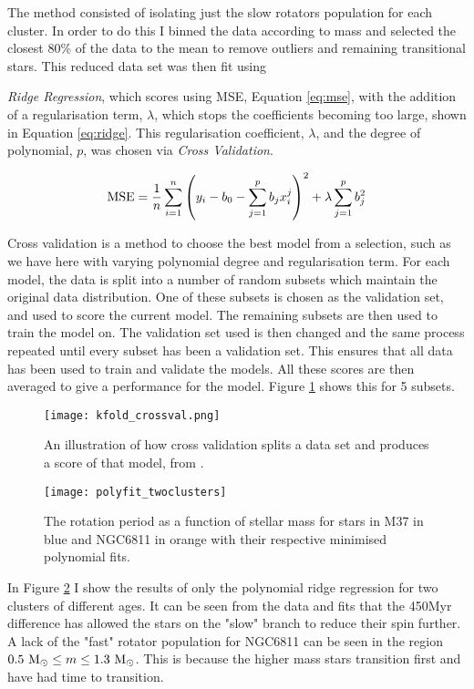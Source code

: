 \documentclass[fleqn,usenatbib]{mnras}
\begin{document}
The method consisted of isolating just the slow rotators population for each cluster.
In order to do this I binned the data according to mass and selected the closest 80\% of the data to the mean to remove outliers and remaining transitional stars.
This reduced data set was then fit using {\textit{Ridge Regression}, which scores using MSE, Equation \ref{eq:mse}, with the addition of a regularisation term, $\lambda$, which stops the coefficients becoming too large, shown in Equation \ref{eq:ridge}.
This regularisation coefficient, $\lambda$, and the degree of polynomial, $p$, was chosen via \textit{Cross Validation}.

\begin{equation}
	\label{eq:ridge}
	\textup{MSE} = \frac{1}{n}\sum_{i = 1}^n \left(y_i - b_0 - \sum_{j = 1}^p b_jx_i^j \right)^2 + \lambda \sum_{j = 1}^p b^2_j
\end{equation}

Cross validation is a method to choose the best model from a selection, such as we have here with varying polynomial degree and regularisation term.
For each model, the data is split into a number of random subsets which maintain the original data distribution.
One of these subsets is chosen as the validation set, and used to score the current model.
The remaining subsets are then used to train the model on.
The validation set used is then changed and the same process repeated until every subset has been a validation set.
This ensures that all data has been used to train and validate the models.
All these scores are then averaged to give a performance for the model.
Figure \ref{fig:cross_validation} shows this for 5 subsets.

\begin{figure}
	\texttt{[image: kfold\_crossval.png]}
	\caption{An illustration of how cross validation splits a data set and produces a score of that model, from \protect\cite{CrossVal}.}
	\label{fig:cross_validation}
\end{figure}



\begin{figure}
	\texttt{[image: polyfit\_twoclusters]}
	\caption{The rotation period as a function of stellar mass for stars in  M37 in blue and NGC6811 in orange with their respective minimised polynomial fits.}
	\label{fig:polyfit_twoclusters}
\end{figure}

In Figure \ref{fig:polyfit_twoclusters} I show the results of only the polynomial ridge regression for two clusters of different ages.
It can be seen from the data and fits that the 450Myr difference has allowed the stars on the "slow" branch to reduce their spin further.
A lack of the "fast" rotator population for NGC6811 can be seen in the region $0.5~\textup{M}_\odot \leq m \leq 1.3~\textup{M}_\odot$.
This is because the higher mass stars transition first and have had time to transition.

}
\end{document}
